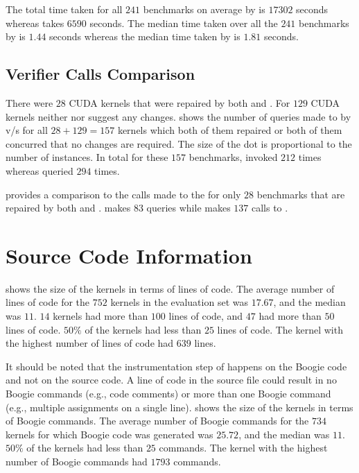 The total time taken for all $241$ benchmarks on average by \autosync is $17302$ seconds whereas \tool takes $6590$ seconds. The median time taken over all the $241$ benchmarks by \autosync is $1.44$ seconds whereas the median time taken by \tool is $1.81$ seconds.



\subsection{Verifier Calls Comparison}
There were $28$ CUDA kernels that were repaired by both \tool and \autosync. For $129$ CUDA kernels neither \tool nor \autosync suggest any changes.  shows the number of queries made to \verifier by \autosync v/s \tool for all $28+129=157$ kernels which both of them repaired or both of them concurred that no changes are required. The size of the dot is proportional to the number of instances. In total for these $157$ benchmarks, \autosync invoked \verifier $212$ times whereas \tool queried \verifier $294$ times.

 provides a comparison to the calls made to the \verifier for only $28$ benchmarks that are repaired by both \tool and \autosync. \tool makes $83$ queries while \autosync makes $137$ calls to \verifier.



\section{Source Code Information}

 shows the size of the kernels in terms of lines of code. The average number of lines of code for the $752$ kernels in the evaluation set was $17.67$, and the median was $11$. $14$ kernels had more than $100$ lines of code, and $47$ had more than $50$ lines of code. $50\%$ of the kernels had less than $25$ lines of code. The kernel with the highest number of lines of code had $639$ lines.



It should be noted that the instrumentation step of \tool happens on the Boogie code and not on the source code. A line of code in the source file could result in no Boogie commands (e.g., code comments) or more than one Boogie command (e.g., multiple assignments on a single line).  shows the size of the kernels in terms of Boogie commands. The average number of Boogie commands for the $734$ kernels for which Boogie code was generated was $25.72$, and the median was $11$. $50\%$ of the kernels had less than $25$ commands. The kernel with the highest number of Boogie commands had $1793$ commands.

